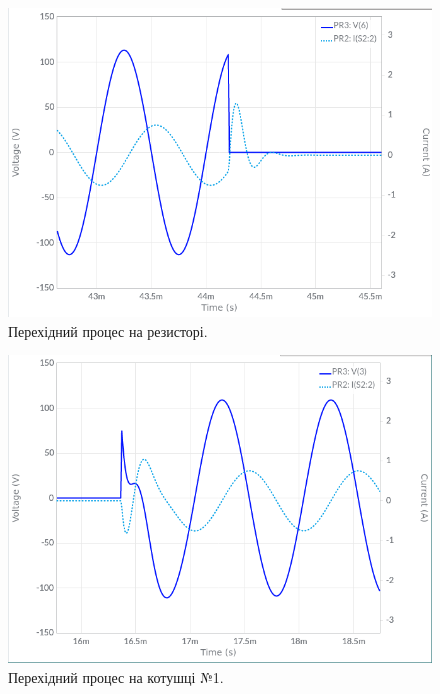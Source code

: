 \documentclass{article}
\begin{document}
\begin{normalsize}
	\begin{figure}[H]
		\centering
		\includegraphics[scale=0.5]{12}
		\caption{Перехідний процес на резисторі.}
	\end{figure}

	\begin{figure}[H]
		\centering
		\includegraphics[scale=0.5]{21}
		\caption{Перехідний процес на котушці №1.}
	\end{figure}
	

\end{normalsize}
\end{document}
